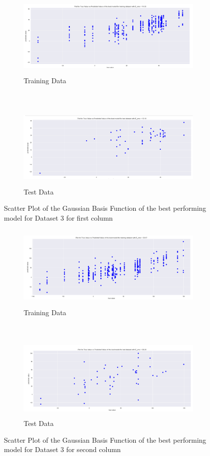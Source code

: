 \begin{figure}[h]
    \centering
    \begin{subfigure}[t]{0.50\textwidth}
        \centering
        \includegraphics[height=1.6in]{Task3_new_images/rwd_tr_y0.png}
        \caption{Training Data}
    \end{subfigure}%
    ~ 
    \begin{subfigure}[t]{0.50\textwidth}
        \centering
        \includegraphics[height=1.6in]{Task3_new_images/rwd_test_y0.png}
        \caption{Test Data}
    \end{subfigure}%
    \caption{Scatter Plot of the Gaussian Basis Function of the best performing model for Dataset 3 for first column}
    \label{fig:18}
\end{figure}

\begin{figure}[h]
    \centering
    \begin{subfigure}[t]{0.50\textwidth}
        \centering
        \includegraphics[height=1.6in]{Task3_new_images/rwd_tr_y1.png}
        \caption{Training Data}
    \end{subfigure}%
    ~ 
    \begin{subfigure}[t]{0.50\textwidth}
        \centering
        \includegraphics[height=1.6in]{Task3_new_images/rwd_test_y1 .png}
        \caption{Test Data}
    \end{subfigure}%
    \caption{Scatter Plot of the Gaussian Basis Function of the best performing model for Dataset 3 for second column}
    \label{fig:18}
\end{figure}

